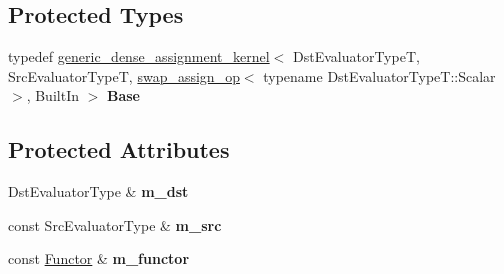 \subsection*{Protected Types}
\begin{DoxyCompactItemize}
\item 
\mbox{\label{class_eigen_1_1internal_1_1generic__dense__assignment__kernel_3_01_dst_evaluator_type_t_00_01_sr759181e846694beea0b332c7e3bbe519_a82ba87f046730247fa44c41b2ff4628a}} 
typedef \mbox{\hyperlink{class_eigen_1_1internal_1_1generic__dense__assignment__kernel}{generic\+\_\+dense\+\_\+assignment\+\_\+kernel}}$<$ Dst\+Evaluator\+TypeT, Src\+Evaluator\+TypeT, \mbox{\hyperlink{struct_eigen_1_1internal_1_1swap__assign__op}{swap\+\_\+assign\+\_\+op}}$<$ typename Dst\+Evaluator\+Type\+T\+::\+Scalar $>$, Built\+In $>$ {\bfseries Base}
\end{DoxyCompactItemize}
\subsection*{Protected Attributes}
\begin{DoxyCompactItemize}
\item 
\mbox{\label{class_eigen_1_1internal_1_1generic__dense__assignment__kernel_3_01_dst_evaluator_type_t_00_01_sr759181e846694beea0b332c7e3bbe519_a8df443ccdd70a127d6c6bc4578ca1660}} 
Dst\+Evaluator\+Type \& {\bfseries m\+\_\+dst}
\item 
\mbox{\label{class_eigen_1_1internal_1_1generic__dense__assignment__kernel_3_01_dst_evaluator_type_t_00_01_sr759181e846694beea0b332c7e3bbe519_a415b02ffc7e2621aac6b375240f42ae8}} 
const Src\+Evaluator\+Type \& {\bfseries m\+\_\+src}
\item 
\mbox{\label{class_eigen_1_1internal_1_1generic__dense__assignment__kernel_3_01_dst_evaluator_type_t_00_01_sr759181e846694beea0b332c7e3bbe519_a9823fd7d0d9532d51d9c16b4c4fd677f}} 
const \mbox{\hyperlink{struct_eigen_1_1internal_1_1swap__assign__op}{Functor}} \& {\bfseries m\+\_\+functor}
\end{DoxyCompactItemize}
